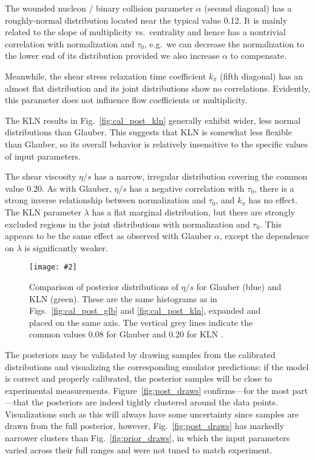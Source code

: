 \documentclass[aps,prc,reprint,superscriptaddress,amsmath]{revtex4-1}
\newcommand{\colfig}[3][t]{
  \begin{figure}[#1]
    \texttt{[image: \#2]}
    \caption{\label{fig:#2}#3}
  \end{figure}
}
\begin{document}
The wounded nucleon / binary collision parameter $\alpha$ (second diagonal) has a roughly-normal distribution located near the typical value 0.12.
It is mainly related to the slope of multiplicity vs.\ centrality and hence has a nontrivial correlation with normalization and $\tau_0$, e.g.\ we can decrease the normalization to the lower end of its distribution provided we also increase $\alpha$ to compensate.

Meanwhile, the shear stress relaxation time coefficient $k_\pi$ (fifth diagonal) has an almost flat distribution and its joint distributions show no correlations.
Evidently, this parameter does not influence flow coefficients or multiplicity.

The KLN results in Fig.~\ref{fig:cal_post_kln} generally exhibit wider, less normal distributions than Glauber.
This suggests that KLN is somewhat less flexible than Glauber, so its overall behavior is relatively insensitive to the specific values of input parameters.

The shear viscosity $\eta/s$ has a narrow, irregular distribution covering the common value 0.20.
As with Glauber, $\eta/s$ has a negative correlation with $\tau_0$, there is a strong inverse relationship between normalization and $\tau_0$, and $k_\pi$ has no effect.
The KLN parameter $\lambda$ has a flat marginal distribution, but there are strongly excluded regions in the joint distributions with normalization and $\tau_0$.
This appears to be the same effect as observed with Glauber $\alpha$, except the dependence on $\lambda$ is significantly weaker.

\colfig[b]{post_compare}{
  Comparison of posterior distributions of $\eta/s$ for Glauber (blue) and KLN (green).
  These are the same histograms as in Figs.~\ref{fig:cal_post_glb} and \ref{fig:cal_post_kln}, expanded and placed on the same axis.
  The vertical grey lines indicate the common values 0.08 for Glauber and 0.20 for KLN \cite{Shen:2011zc,Heinz:2011kt}.
}

The posteriors may be validated by drawing samples from the calibrated distributions and visualizing the corresponding emulator predictions:
if the model is correct and properly calibrated, the posterior samples will be close to experimental measurements.
Figure~\ref{fig:post_draws} confirms---for the most part---that the posteriors are indeed tightly clustered around the data points.
Visualizations such as this will always have some uncertainty since samples are drawn from the full posterior, however, Fig.~\ref{fig:post_draws} has markedly narrower clusters than Fig.~\ref{fig:prior_draws}, in which the input parameters varied across their full ranges and were not tuned to match experiment.
\end{document}
